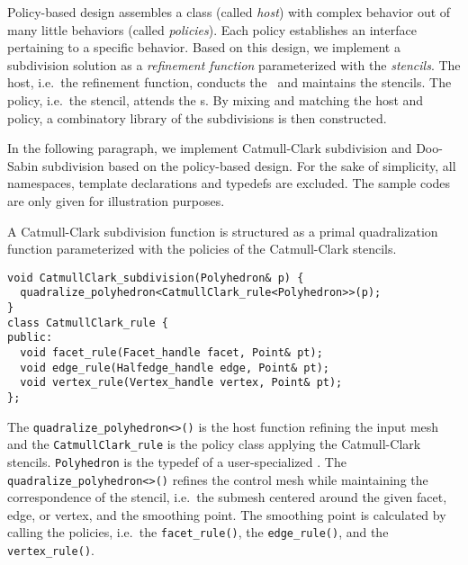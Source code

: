 Policy-based design \cite{Alexandrescu:2001:MCD} assembles a 
class (called \emph{host}) with complex behavior out of many 
little behaviors (called \emph{policies}). Each policy establishes
an interface pertaining to a specific behavior.
Based on this design, we implement a subdivision solution as 
a \emph{refinement function} parameterized with the 
\emph{stencils}. The host, i.e.\ the refinement function,
conducts the \tr\ and maintains the stencils. The policy,
i.e.\ the stencil, attends the \gm s. By mixing and matching
the host and policy, a combinatory library of the subdivisions
is then constructed. 

In the following paragraph, we implement Catmull-Clark 
subdivision and Doo-Sabin subdivision based on the 
policy-based design. For the sake of simplicity, all 
namespaces, template declarations
and typedefs are excluded. The sample codes are only
given for illustration purposes.

A Catmull-Clark subdivision function is structured 
as a primal quadralization function parameterized 
with the policies of the Catmull-Clark stencils.
\begin{lstlisting}
void CatmullClark_subdivision(Polyhedron& p) {
  quadralize_polyhedron<CatmullClark_rule<Polyhedron>>(p);
}
class CatmullClark_rule {
public:
  void facet_rule(Facet_handle facet, Point& pt);
  void edge_rule(Halfedge_handle edge, Point& pt);
  void vertex_rule(Vertex_handle vertex, Point& pt);
};
\end{lstlisting}
The \lstinline!quadralize_polyhedron<>()! is the host function
refining the input mesh
and the \lstinline!CatmullClark_rule!
is the policy class applying the Catmull-Clark stencils.
\lstinline!Polyhedron! is the typedef of a user-specialized
\cgalpoly . The \lstinline!quadralize_polyhedron<>()!
refines the control mesh while maintaining the 
correspondence of the stencil, i.e.\ the submesh centered 
around the given facet, edge, or
vertex, and the smoothing point. The smoothing point
is calculated by calling the policies, i.e.\
the \lstinline!facet_rule()!, the \lstinline!edge_rule()!,
and the \lstinline!vertex_rule()!.

